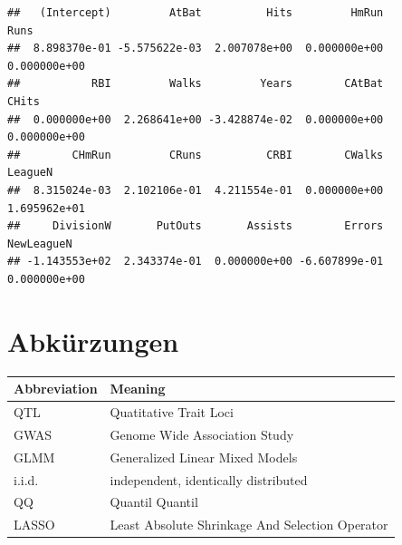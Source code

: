 \documentclass[]{book}
\begin{document}
\begin{verbatim}
##   (Intercept)         AtBat          Hits         HmRun          Runs 
##  8.898370e-01 -5.575622e-03  2.007078e+00  0.000000e+00  0.000000e+00 
##           RBI         Walks         Years        CAtBat         CHits 
##  0.000000e+00  2.268641e+00 -3.428874e-02  0.000000e+00  0.000000e+00 
##        CHmRun         CRuns          CRBI        CWalks       LeagueN 
##  8.315024e-03  2.102106e-01  4.211554e-01  0.000000e+00  1.695962e+01 
##     DivisionW       PutOuts       Assists        Errors    NewLeagueN 
## -1.143553e+02  2.343374e-01  0.000000e+00 -6.607899e-01  0.000000e+00
\end{verbatim}

\chapter*{Abkürzungen}\label{abkurzungen}

\begin{tabular}{l|l}
\hline
Abbreviation & Meaning\\
\hline
QTL & Quatitative Trait Loci\\
\hline
GWAS & Genome Wide Association Study\\
\hline
GLMM & Generalized Linear Mixed Models\\
\hline
i.i.d. & independent, identically distributed\\
\hline
QQ & Quantil Quantil\\
\hline
LASSO & Least Absolute Shrinkage And Selection Operator\\
\hline
\end{tabular}


\end{document}
